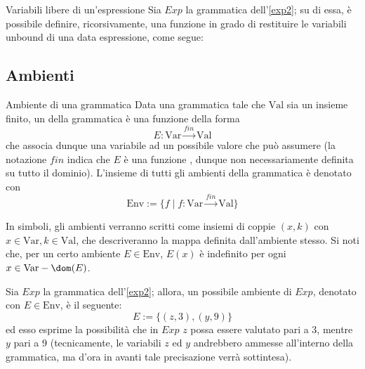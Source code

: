 \documentclass[a4paper, 12pt]{report}
\begin{document}
    \begin{framedobs}{Variabili libere di un'espressione}
        Sia $Exp$ la grammatica dell'\cref{exp2}; su di essa, è possibile definire, ricorsivamente, una funzione in grado di restituire le variabili unbound di una data espressione, come segue: 
    \end{framedobs}

    \subsection{Ambienti}
    
    \begin{frameddefn}[label={env}]{Ambiente di una grammatica}
        Data una grammatica tale che $\mathrm{Val}$ sia un insieme finito, un  della grammatica è una funzione della forma $$E: \mathrm{Var} \xrightarrow{fin} \mathrm{Val}$$ che associa dunque una variabile ad un possibile valore che può assumere (la notazione $fin$ indica che $E$ è una funzione , dunque non necessariamente definita su tutto il dominio). L'insieme di tutti gli ambienti della grammatica è denotato con $$\mathrm{Env} := \{f \mid f : \mathrm{Var} \xrightarrow{fin} \mathrm{Val} \}$$

        In simboli, gli ambienti verranno scritti come insiemi di coppie $(x, k)$ con $x \in \mathrm{Var}, k \in \mathrm{Val}$, che descriveranno la mappa definita dall'ambiente stesso. Si noti che, per un certo ambiente $E \in \mathrm{Env}$, $E(x)$ è indefinito per ogni $x \in \mathrm{Var} - \dom(E)$.
    \end{frameddefn}

    \begin{example}
        Sia $Exp$ la grammatica dell'\cref{exp2}; allora, un possibile ambiente di $Exp$, denotato con $E \in \mathrm{Env}$, è il seguente: $$E := \{(z,3), (y, 9) \}$$ ed esso esprime la possibilità che in $Exp$ $z$ possa essere valutato pari a 3, mentre $y$ pari a 9 (tecnicamente, le variabili $z$ ed $y$ andrebbero ammesse all'interno della grammatica, ma d'ora in avanti tale precisazione verrà sottintesa).
    \end{example}
\end{document}
